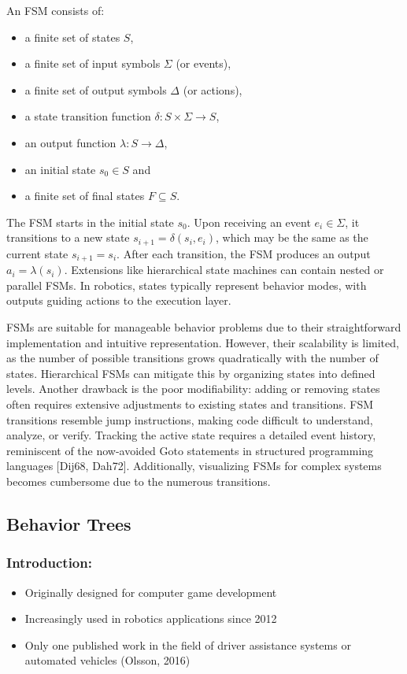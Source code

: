 An FSM consists of:

\begin{itemize}
  \item a finite set of states $S$,
  \item a finite set of input symbols $\Sigma$ (or events),
  \item a finite set of output symbols $\Delta$ (or actions),
  \item a state transition function $\delta: S \times \Sigma \rightarrow S$,
  \item an output function $\lambda: S \rightarrow \Delta$,
  \item an initial state $s_0 \in S$ and
  \item a finite set of final states $F \subseteq S$.
\end{itemize}

The FSM starts in the initial state $s_0$.
Upon receiving an event $e_i \in \Sigma$, it transitions to a new state $s_{i+1} = \delta(s_i, e_i)$, which may be the same as the current state $s_{i+1} = s_i$.
After each transition, the FSM produces an output $a_i = \lambda(s_i)$.
Extensions like hierarchical state machines can contain nested or parallel FSMs.
In robotics, states typically represent behavior modes, with outputs guiding actions to the execution layer.

FSMs are suitable for manageable behavior problems due to their straightforward implementation and intuitive representation.
However, their scalability is limited, as the number of possible transitions grows quadratically with the number of states.
Hierarchical FSMs can mitigate this by organizing states into defined levels.
Another drawback is the poor modifiability: adding or removing states often requires extensive adjustments to existing states and transitions.
FSM transitions resemble jump instructions, making code difficult to understand, analyze, or verify.
Tracking the active state requires a detailed event history, reminiscent of the now-avoided Goto statements in structured programming languages [Dij68, Dah72].
Additionally, visualizing FSMs for complex systems becomes cumbersome due to the numerous transitions.
\subsection{Behavior Trees}

\subsubsection*{Introduction:}
\begin{itemize}
    \item Originally designed for computer game development
    \item Increasingly used in robotics applications since 2012
    \item Only one published work in the field of driver assistance systems or automated vehicles (Olsson, 2016)
\end{itemize}

